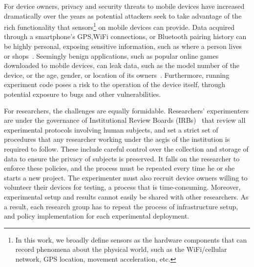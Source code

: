For device owners, privacy and security threats to mobile devices have
increased dramatically over the years as potential attackers seek
to take advantage of the rich functionality that %
sensors\footnote{\scriptsize In this work, we broadly define sensors
as the hardware components that can record phenomena about the
physical world, such as the WiFi/cellular network, GPS location,
movement acceleration, etc.} on mobile devices can provide.
Data acquired through a smartphone's GPS,WiFi
connections, or Bluetooth pairing history can be highly personal,
exposing sensitive information, such as where a person lives or 
shops~\cite{han2012accomplice}. Seemingly benign applications, 
such as popular online games downloaded to mobile devices, can
leak data, such as the model number of the device, or the age, gender, 
or location of its owners~\cite{AngryBirds}. Furthermore, running experiment code poses 
a risk to the operation of the device itself, through potential exposure 
to bugs and other vulnerabilities. 

For researchers, the challenges are equally formidable. 
Researchers' experimenters are under the governance of Institutional 
Review Boards (IRBs)~\cite{irb} that
review all experimental protocols involving human subjects,
and set a strict set of procedures that any researcher working under
the aegis of the institution is required to follow. These include
careful control over the collection and storage of data to ensure the 
privacy of subjects is preserved. It falls on the researcher to enforce 
these policies, and the process must be repeated every time he or 
she starts a new project. The experimenter must also recruit device 
owners willing to volunteer their devices for testing, a process that 
is time-consuming. Moreover, experimental setup and results cannot 
easily be shared with other researchers. As a result, each research 
group has to repeat the process of infrastructure setup, and policy 
implementation  for each experimental deployment.

